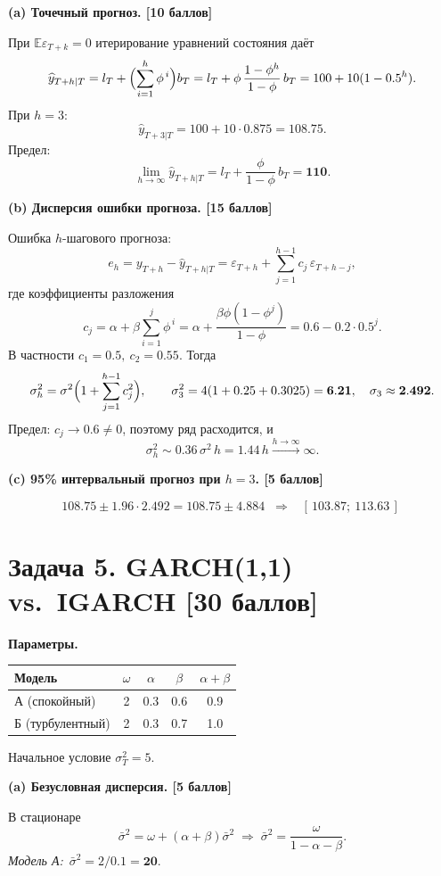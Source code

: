 \documentclass[11pt,a4paper]{article}
\newcommand{\E}{\mathbb{E}}
\newcommand{\eps}{\varepsilon}
\newcommand{\step}[1]{\medskip\noindent\textbf{#1}\par\nobreak\vspace{2pt}}
\begin{document}
\step{(a) Точечный прогноз. \hfill [10 баллов]}
При \(\E\eps_{T+k}=0\) итерирование уравнений состояния даёт
\[
\widehat y_{T+h|T}=l_T+\Bigl(\sum_{i=1}^{h}\phi^{\,i}\Bigr)b_T
=l_T+\phi\,\frac{1-\phi^{h}}{1-\phi}\,b_T
=100+10(1-0.5^{h}).
\]
При \(h=3\):
\[
\widehat y_{T+3|T}=100+10\cdot 0.875=\mathbf{108.75}.
\]
Предел:
\[
\lim_{h\to\infty}\widehat y_{T+h|T}=l_T+\frac{\phi}{1-\phi}\,b_T=\mathbf{110}.
\]

\step{(b) Дисперсия ошибки прогноза. \hfill [15 баллов]}
Ошибка \(h\)-шагового прогноза:
\[
e_h=y_{T+h}-\widehat y_{T+h|T}=\eps_{T+h}+\sum_{j=1}^{h-1}c_j\,\eps_{T+h-j},
\]
где коэффициенты разложения
\[
c_j=\alpha+\beta\sum_{i=1}^{j}\phi^{\,i}
=\alpha+\frac{\beta\phi(1-\phi^{j})}{1-\phi}
=0.6-0.2\cdot 0.5^{j}.
\]
В частности \(c_1=0.5,\ c_2=0.55\). Тогда
\[
\sigma^2_h=\sigma^2\Bigl(1+\sum_{j=1}^{h-1}c_j^{2}\Bigr),
\qquad
\sigma^2_3=4(1+0.25+0.3025)=\mathbf{6.21},\quad \sigma_3\approx\mathbf{2.492}.
\]
Предел: \(c_j\to 0.6\ne 0\), поэтому ряд расходится, и
\[
\sigma^2_h\sim 0.36\,\sigma^2\,h=1.44\,h\xrightarrow{h\to\infty}\infty.
\]

\step{(c) 95\% интервальный прогноз при \(h=3\). \hfill [5 баллов]}
\[
108.75\pm 1.96\cdot 2.492=108.75\pm 4.884
\;\;\Longrightarrow\;\;
\boxed{\;[\,103.87;\ 113.63\,]\;}
\]

\section*{Задача 5. GARCH(1,1) vs.\ IGARCH \hfill \normalsize[30 баллов]}

\textbf{Параметры.}

\begin{center}
\begin{tabular}{@{}l|ccc|c@{}}
\toprule
Модель & \(\omega\) & \(\alpha\) & \(\beta\) & \(\alpha+\beta\) \\
\midrule
А (спокойный) & 2 & 0.3 & 0.6 & 0.9 \\
Б (турбулентный) & 2 & 0.3 & 0.7 & 1.0 \\
\bottomrule
\end{tabular}
\end{center}

Начальное условие \(\sigma^2_T=5\).

\step{(a) Безусловная дисперсия. \hfill [5 баллов]}
В стационаре
\[
\bar\sigma^2=\omega+(\alpha+\beta)\bar\sigma^2
\;\Longrightarrow\;
\bar\sigma^2=\frac{\omega}{1-\alpha-\beta}.
\]
\emph{Модель А:}\ \(\bar\sigma^2=2/0.1=\mathbf{20}\).
\end{document}
